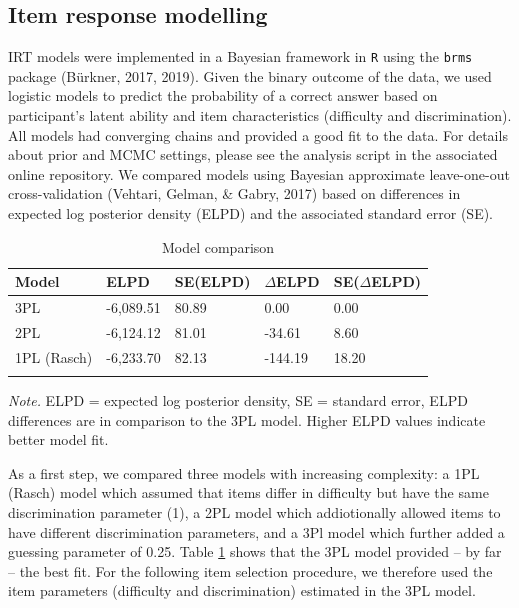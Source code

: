 \documentclass[
  man,floatsintext]{apa6}
\begin{document}
\hypertarget{item-response-modelling}{%
\subsection{Item response modelling}\label{item-response-modelling}}

IRT models were implemented in a Bayesian framework in \texttt{R} using the \texttt{brms} package (Bürkner, 2017, 2019). Given the binary outcome of the data, we used logistic models to predict the probability of a correct answer based on participant's latent ability and item characteristics (difficulty and discrimination). All models had converging chains and provided a good fit to the data. For details about prior and MCMC settings, please see the analysis script in the associated online repository. We compared models using Bayesian approximate leave-one-out cross-validation (Vehtari, Gelman, \& Gabry, 2017) based on differences in expected log posterior density (ELPD) and the associated standard error (SE).

\begin{table}[tbp]

\begin{center}
\begin{threeparttable}

\caption{\label{tab:tab1}Model comparison}

\begin{tabular}{lllll}
\toprule
Model & ELPD & SE(ELPD) & $\Delta$ELPD & SE($\Delta$ELPD)\\
\midrule
3PL & -6,089.51 & 80.89 & 0.00 & 0.00\\
2PL & -6,124.12 & 81.01 & -34.61 & 8.60\\
1PL (Rasch) & -6,233.70 & 82.13 & -144.19 & 18.20\\
\bottomrule
\addlinespace
\end{tabular}

\begin{tablenotes}[para]
\normalsize{\textit{Note.} ELPD = expected log posterior density, SE = standard error, ELPD differences are in comparison to the 3PL model. Higher ELPD values indicate better model fit.}
\end{tablenotes}

\end{threeparttable}
\end{center}

\end{table}

As a first step, we compared three models with increasing complexity: a 1PL (Rasch) model which assumed that items differ in difficulty but have the same discrimination parameter (1), a 2PL model which addiotionally allowed items to have different discrimination parameters, and a 3Pl model which further added a guessing parameter of 0.25. Table \ref{tab:tab1} shows that the 3PL model provided -- by far -- the best fit. For the following item selection procedure, we therefore used the item parameters (difficulty and discrimination) estimated in the 3PL model.
\end{document}
